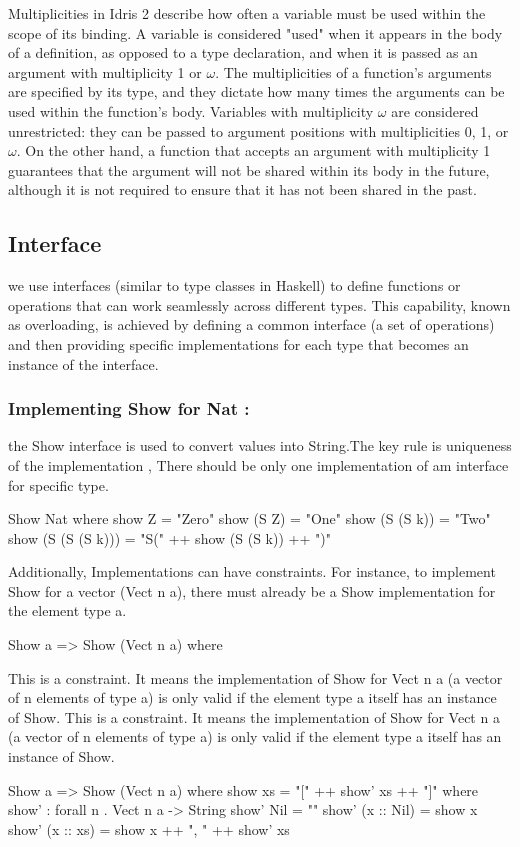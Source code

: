 \documentclass[]{rptuseminar}
\begin{document}
Multiplicities in Idris 2 describe how often a variable must be used within the scope of its binding. A variable is considered "used" when it appears in the body of a definition, as opposed to a type declaration, and when it is passed as an argument with multiplicity 1 or \(\omega\). The multiplicities of a function's arguments are specified by its type, and they dictate how many times the arguments can be used within the function's body. Variables with multiplicity \(\omega\) are considered unrestricted: they can be passed to argument positions with multiplicities 0, 1, or \(\omega\). On the other hand, a function that accepts an argument with multiplicity 1 guarantees that the argument will not be shared within its body in the future, although it is not required to ensure that it has not been shared in the past\cite{brady2021idris}.
\subsection{Interface}
we use interfaces (similar to type classes in Haskell) to define functions or operations that can work seamlessly across different types. This capability, known as overloading, is achieved by defining a common interface (a set of operations) and then providing specific implementations for each type that becomes an instance of the interface.

\subsubsection{Implementing Show for Nat :}
the Show interface is used to convert values into String.The key rule is uniqueness of the implementation , There should be only one implementation of am interface for specific type.
\begin{idris}
    Show Nat where
    show Z     = "Zero"
    show (S Z) = "One"
    show (S (S k)) = "Two"
    show (S (S (S k))) = "S(" ++ show (S (S k)) ++ ")"
  
\end{idris}
Additionally, Implementations can have constraints. For instance, to implement Show for a vector (Vect n a), there must already be a Show implementation for the element type a.
\begin{idris}
    Show a => Show (Vect n a) where
\end{idris}
This is a constraint. It means the implementation of Show for Vect n a (a vector of n elements of type a) is only valid if the element type a itself has an instance of Show. This is a constraint. It means the implementation of Show for Vect n a (a vector of n elements of type a) is only valid if the element type a itself has an instance of Show.
\begin{idris}
    Show a => Show (Vect n a) where
    show xs = "[" ++ show' xs ++ "]" where
        show' : forall n . Vect n a -> String
        show' Nil        = ""
        show' (x :: Nil) = show x
        show' (x :: xs)  = show x ++ ", " ++ show' xs
\end{idris}
\end{document}
